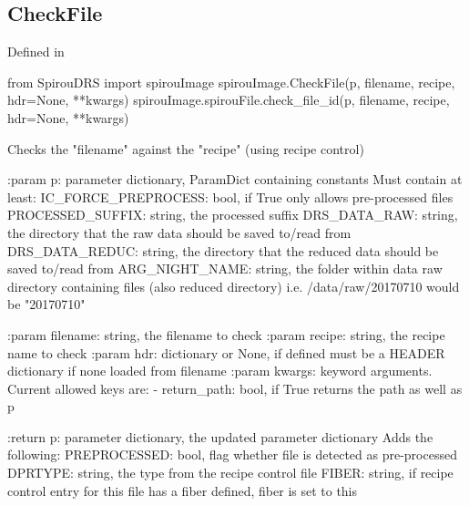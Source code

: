 \noindent\begin{minipage}{\textwidth}
\subsection{CheckFile}

Defined in \spirouFile{}

\begin{pythonbox}
from SpirouDRS import spirouImage
spirouImage.CheckFile(p, filename, recipe, hdr=None, **kwargs)
spirouImage.spirouFile.check_file_id(p, filename, recipe, hdr=None, **kwargs)
\end{pythonbox}

\begin{pythondocstring}
Checks the "filename" against the "recipe" (using recipe control)

:param p: parameter dictionary, ParamDict containing constants
    Must contain at least:
        IC_FORCE_PREPROCESS: bool, if True only allows pre-processed files
        PROCESSED_SUFFIX: string, the processed suffix
        DRS_DATA_RAW: string, the directory that the raw data should
                      be saved to/read from
            DRS_DATA_REDUC: string, the directory that the reduced data
                            should be saved to/read from
        ARG_NIGHT_NAME: string, the folder within data raw directory
                        containing files (also reduced directory) i.e.
                        /data/raw/20170710 would be "20170710"
        
:param filename: string, the filename to check 
:param recipe: string, the recipe name to check
:param hdr: dictionary or None, if defined must be a HEADER dictionary if
            none loaded from filename
:param kwargs: keyword arguments. Current allowed keys are:
                - return_path: bool, if True returns the path as well as p

:return p: parameter dictionary, the updated parameter dictionary
        Adds the following:
            PREPROCESSED: bool, flag whether file is detected as 
                          pre-processed
            DPRTYPE: string, the type from the recipe control file 
            FIBER: string, if recipe control entry for this file has a
                   fiber defined, fiber is set to this
\end{pythondocstring}
\end{minipage}




